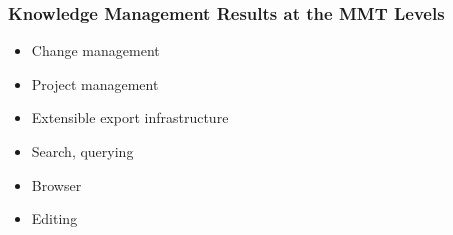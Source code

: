 \documentclass{beamer}
\begin{document}
\begin{frame}\frametitle{Knowledge Management Results at the MMT Levels}
	\begin{itemize}
		\item Change management
		\item Project management
		\item Extensible export infrastructure
		\item Search, querying
		\item Browser
		\item Editing
	\end{itemize}
\end{frame}

\end{document}
